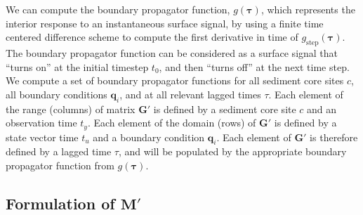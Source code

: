 \documentclass[draft]{agujournal2019}
\begin{document}
We can compute the boundary propagator function, $g(\bm{\tau})$, which represents the interior response to an instantaneous surface signal, by using a finite time centered difference scheme to compute the first derivative in time of $g_{\mathrm{step}}(\bm{\tau})$. The boundary propagator function can be considered as  a surface signal that ``turns on'' at the initial timestep $t_{0}$, and then ``turns off'' at the next time step. We compute a set of boundary propagator functions for all sediment core sites $c$, all boundary conditions $\mathbf{q}_{i}$, and at all relevant lagged times $\tau$. Each element of the range (columns) of matrix $\mathbf{G}'$ is defined by a sediment core site $c$ and an observation time $t_{y}$.  Each element of the domain (rows) of $\mathbf{G}'$ is defined by a state vector time $t_{u}$ and a boundary condition $\mathbf{q}_{i}$. Each element of $\mathbf{G}'$ is therefore defined by a lagged time $\tau$, and will be populated by the appropriate boundary propagator function from $g(\bm{\tau})$.
\subsection{Formulation of $\mathbf{M\prime}$ \label{sec:Mprime}}
\end{document}
